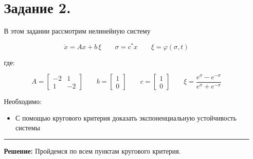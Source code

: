 \documentclass[a4paper,12pt]{article}
\begin{document}
	\newpage
	\section{Задание 2.}

	В этом задании рассмотрим нелинейную систему

	\[
	\dot{x} = A x + b\,\xi
	\qquad 
	\sigma = c^{*} x
	\qquad
	\xi = \varphi(\sigma, t)
	\]
	
	где:
	
	\[
	A = 
	\begin{bmatrix}
		-2 & 1 \\
		1 & -2
	\end{bmatrix}
	\qquad
	b =
	\begin{bmatrix}
		1 \\
		0
	\end{bmatrix}
	\qquad
	c =
	\begin{bmatrix}
		1 \\
		0
	\end{bmatrix}
	\qquad
	\xi = \frac{e^{\sigma} - e^{-\sigma}}{e^{\sigma} + e^{-\sigma}}
	\]

	Необходимо: 
	\begin{itemize}
		\item С помощью кругового критерия доказать экспоненциальную устойчивость системы
	\end{itemize}

	\hrule
	\[\]	
	\textbf{Решение: } Пройдемся по всем пунктам кругового критерия.
	
\end{document}
